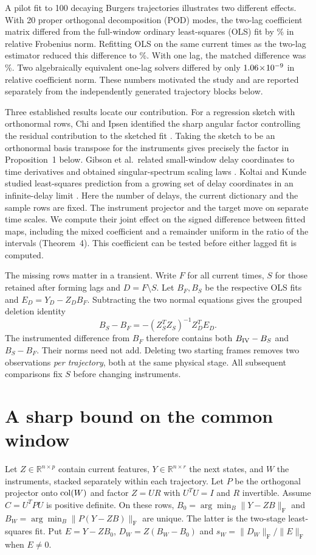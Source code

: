 \documentclass[11pt,a4paper]{article}
\newcommand{\RR}{\mathbb R}
\newcommand{\col}{\mathop{\rm col}}
\newcommand{\F}{\mathrm F}
\begin{document}
A pilot fit to 100 decaying Burgers trajectories illustrates two different effects. With 20 proper orthogonal decomposition (POD) modes, the two-lag coefficient matrix differed from the full-window ordinary least-squares (OLS) fit by \FullTwo\% in relative Frobenius norm. Refitting OLS on the same current times as the two-lag estimator reduced this difference to \MatchTwo\%. With one lag, the matched difference was \MatchOne\%. Two algebraically equivalent one-lag solvers differed by only $1.06\!\times\!10^{-9}$ in relative coefficient norm. These numbers motivated the study and are reported separately from the independently generated trajectory blocks below.

Three established results locate our contribution. For a regression sketch with orthonormal rows, Chi and Ipsen identified the sharp angular factor controlling the residual contribution to the sketched fit \cite[Prop.~4]{chi}. Taking the sketch to be an orthonormal basis transpose for the instruments gives precisely the factor in Proposition~1 below. Gibson et al.\ related small-window delay coordinates to time derivatives and obtained singular-spectrum scaling laws \cite{gibson}. Koltai and Kunde studied least-squares prediction from a growing set of delay coordinates in an infinite-delay limit \cite{koltai}. Here the number of delays, the current dictionary and the sample rows are fixed. The instrument projector and the target move on separate time scales. We compute their joint effect on the signed difference between fitted maps, including the mixed coefficient and a remainder uniform in the ratio of the intervals (Theorem~4). This coefficient can be tested before either lagged fit is computed.

The missing rows matter in a transient. Write $F$ for all current times, $S$ for those retained after forming lags and $D=F\setminus S$. Let $B_F,B_S$ be the respective OLS fits and $E_D=Y_D-Z_DB_F$. Subtracting the two normal equations gives the grouped deletion identity \cite{cook}
\begin{equation}
 B_S-B_F=-(Z_S^TZ_S)^{-1}Z_D^TE_D. \label{eq:delete}
\end{equation}
The instrumented difference from $B_F$ therefore contains both $B_{\rm IV}-B_S$ and $B_S-B_F$. Their norms need not add. Deleting two starting frames removes two observations \emph{per trajectory}, both at the same physical stage. All subsequent comparisons fix $S$ before changing instruments.

\section{A sharp bound on the common window}
Let $Z\in\RR^{n\times p}$ contain current features, $Y\in\RR^{n\times r}$ the next states, and $W$ the instruments, stacked separately within each trajectory. Let $P$ be the orthogonal projector onto $\col(W)$ and factor $Z=UR$ with $U^TU=I$ and $R$ invertible. Assume $C=U^TPU$ is positive definite. On these rows, $B_0=\arg\min_B\|Y-ZB\|_{\F}$ and $B_W=\arg\min_B\|P(Y-ZB)\|_{\F}$ are unique. The latter is the two-stage least-squares fit. Put $E=Y-ZB_0$, $D_W=Z(B_W-B_0)$ and $s_W=\|D_W\|_{\F}/\|E\|_{\F}$ when $E\ne0$.
\end{document}

